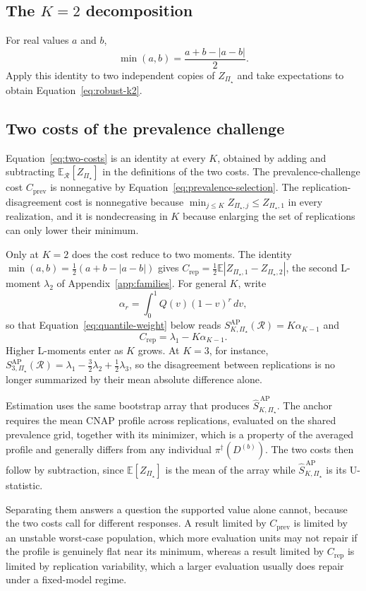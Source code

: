 \documentclass[11pt]{article}
\newcommand{\Regime}{\mathcal{R}}
\newcommand{\PSet}{\Pi_\star}
\newcommand{\E}{\mathbb{E}}
\newcommand{\SRob}{S_{K,\PSet}^{\mathrm{AP}}(\Regime)}
\newcommand{\SRobHat}{\widehat S_{K,\PSet}^{\,\mathrm{AP}}}
\theoremstyle{remark}
\begin{document}
\subsection{The $K=2$ decomposition}

For real values $a$ and $b$,
\[
\min(a,b)
=
\frac{a+b-|a-b|}{2}.
\]
Apply this identity to two independent copies of $Z_{\PSet}$ and take expectations to obtain Equation~\eqref{eq:robust-k2}.

\subsection{Two costs of the prevalence challenge}
\label{app:penalty}

Equation~\eqref{eq:two-costs} is an identity at every $K$, obtained by adding and subtracting $\E_{\Regime}[Z_{\PSet}]$ in the definitions of the two costs. The prevalence-challenge cost $C_{\mathrm{prev}}$ is nonnegative by Equation~\eqref{eq:prevalence-selection}. The replication-disagreement cost is nonnegative because $\min_{j\leq K}Z_{\PSet,j}\leq Z_{\PSet,1}$ in every realization, and it is nondecreasing in $K$ because enlarging the set of replications can only lower their minimum.

Only at $K=2$ does the cost reduce to two moments. The identity $\min(a,b)=\tfrac12(a+b-|a-b|)$ gives $C_{\mathrm{rep}}=\tfrac12\E|Z_{\PSet,1}-Z_{\PSet,2}|$, the second L-moment $\lambda_2$ of Appendix~\ref{app:families}. For general $K$, write
\[
\alpha_r=\int_0^1Q(v)(1-v)^r\,dv,
\]
so that Equation~\eqref{eq:quantile-weight} below reads $\SRob=K\alpha_{K-1}$ and
\[
C_{\mathrm{rep}}=\lambda_1-K\alpha_{K-1}.
\]
Higher L-moments enter as $K$ grows. At $K=3$, for instance, $S_{3,\PSet}^{\mathrm{AP}}(\Regime)=\lambda_1-\tfrac32\lambda_2+\tfrac12\lambda_3$, so the disagreement between replications is no longer summarized by their mean absolute difference alone.

Estimation uses the same bootstrap array that produces $\SRobHat$. The anchor requires the mean CNAP profile across replications, evaluated on the shared prevalence grid, together with its minimizer, which is a property of the averaged profile and generally differs from any individual $\pi^\dagger(D^{(b)})$. The two costs then follow by subtraction, since $\E[Z_{\PSet}]$ is the mean of the array while $\SRobHat$ is its U-statistic.

Separating them answers a question the supported value alone cannot, because the two costs call for different responses. A result limited by $C_{\mathrm{prev}}$ is limited by an unstable worst-case population, which more evaluation units may not repair if the profile is genuinely flat near its minimum, whereas a result limited by $C_{\mathrm{rep}}$ is limited by replication variability, which a larger evaluation usually does repair under a fixed-model regime.
\end{document}
